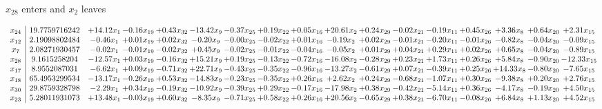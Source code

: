 \documentclass[9pt]{article}
\begin{document}
 $ x_{28} $ enters and $ x_{2} $ leaves 

 \[\begin{array}{c| c c@{\hskip 2pt} c@{\hskip 2pt} c@{\hskip 2pt} c@{\hskip 2pt} c@{\hskip 2pt} c@{\hskip 2pt} c@{\hskip 2pt} c@{\hskip 2pt} c@{\hskip 2pt} c@{\hskip 2pt} c@{\hskip 2pt} c@{\hskip 2pt} c@{\hskip 2pt} c@{\hskip 2pt} c@{\hskip 2pt} }
 x_{24}   &  19.7759716242 & + 14.12 x_{1} & -0.16 x_{19} & +  0.43 x_{32} & -13.42 x_{9} & -0.37 x_{25} & +  0.19 x_{22} & +  0.05 x_{16} & + 20.61 x_{2} & +  0.24 x_{29} & -0.02 x_{21} & -0.19 x_{11} & +  0.45 x_{26} & +  3.36 x_{8} & +  0.64 x_{20} & +  2.31 x_{15}\\
 x_{12}   &  2.19098802484 & -0.46 x_{1} & +  0.01 x_{19} & +  0.02 x_{32} & -0.20 x_{9} & -0.00 x_{25} & -0.02 x_{22} & +  0.01 x_{16} & -0.19 x_{2} & +  0.02 x_{29} & -0.01 x_{21} & -0.20 x_{11} & -0.01 x_{26} & -0.82 x_{8} & -0.04 x_{20} & -0.09 x_{15}\\
 x_{7}   &  2.08271930457 & -0.02 x_{1} & -0.01 x_{19} & -0.02 x_{32} & +  0.45 x_{9} & -0.02 x_{25} & -0.01 x_{22} & -0.04 x_{16} & -0.05 x_{2} & +  0.01 x_{29} & +  0.04 x_{21} & +  0.29 x_{11} & +  0.02 x_{26} & +  0.65 x_{8} & -0.04 x_{20} & -0.89 x_{15}\\
 x_{28}   &  9.1615258204 & -12.57 x_{1} & +  0.03 x_{19} & -0.16 x_{32} & + 15.21 x_{9} & +  0.19 x_{25} & -0.13 x_{22} & -0.72 x_{16} & -16.08 x_{2} & -0.28 x_{29} & +  0.23 x_{21} & +  1.73 x_{11} & +  0.26 x_{26} & +  5.84 x_{8} & -0.90 x_{20} & -12.33 x_{15}\\
 x_{17}   &  8.9552087031 & -6.62 x_{1} & +  0.09 x_{19} & -0.71 x_{32} & + 22.71 x_{9} & -0.43 x_{25} & -0.35 x_{22} & -0.96 x_{16} & -13.27 x_{2} & -0.61 x_{29} & +  0.07 x_{21} & -0.39 x_{11} & +  0.25 x_{26} & + 14.33 x_{8} & -0.80 x_{20} & -7.65 x_{15}\\
 x_{18}   &  65.4953299534 & -13.17 x_{1} & -0.26 x_{19} & +  0.53 x_{32} & -14.83 x_{9} & -0.23 x_{25} & -0.35 x_{22} & +  0.26 x_{16} & +  2.62 x_{2} & +  0.24 x_{29} & -0.68 x_{21} & -1.07 x_{11} & +  0.30 x_{26} & -9.38 x_{8} & +  0.20 x_{20} & +  2.76 x_{15}\\
 x_{30}   &  29.8759328798 & -2.29 x_{1} & +  0.34 x_{19} & -0.19 x_{32} & -10.92 x_{9} & -0.39 x_{25} & +  0.29 x_{22} & -0.17 x_{16} & -17.98 x_{2} & +  0.38 x_{29} & -0.42 x_{21} & -5.14 x_{11} & +  0.36 x_{26} & -4.17 x_{8} & -0.19 x_{20} & +  4.50 x_{15}\\
 x_{23}   &  5.28011931073 & + 13.48 x_{1} & -0.03 x_{19} & +  0.60 x_{32} & -8.35 x_{9} & -0.71 x_{25} & +  0.58 x_{22} & +  0.26 x_{16} & + 20.56 x_{2} & -0.65 x_{29} & +  0.38 x_{21} & -6.70 x_{11} & -0.08 x_{26} & +  6.84 x_{8} & +  1.13 x_{20} & +  4.52 x_{15}\\

\end{array}\]
\end{document}
